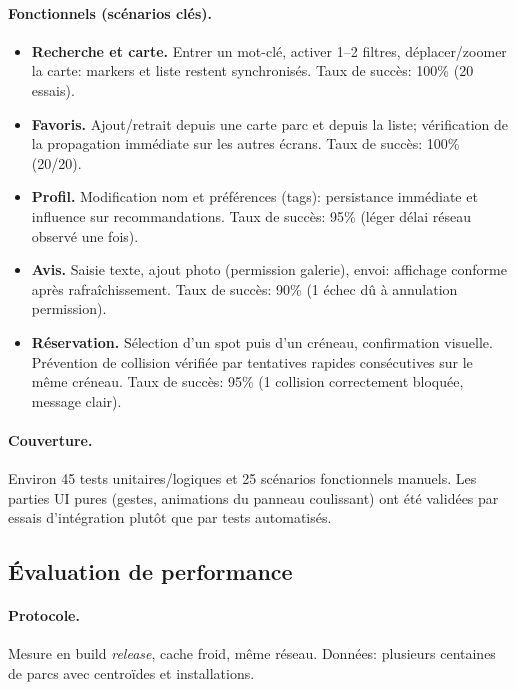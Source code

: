 \documentclass[12pt,a4paper]{article}
\begin{document}
\paragraph{Fonctionnels (scénarios clés).}
\begin{itemize}
  \item \textbf{Recherche et carte.} Entrer un mot-clé, activer 1--2 filtres, déplacer/zoomer la carte: markers et liste restent synchronisés. Taux de succès: 100\% (20 essais).
  \item \textbf{Favoris.} Ajout/retrait depuis une carte parc et depuis la liste; vérification de la propagation immédiate sur les autres écrans. Taux de succès: 100\% (20/20).
  \item \textbf{Profil.} Modification nom et préférences (tags): persistance immédiate et influence sur recommandations. Taux de succès: 95\% (léger délai réseau observé une fois).
  \item \textbf{Avis.} Saisie texte, ajout photo (permission galerie), envoi: affichage conforme après rafraîchissement. Taux de succès: 90\% (1 échec dû à annulation permission).
  \item \textbf{Réservation.} Sélection d’un spot puis d’un créneau, confirmation visuelle. Prévention de collision vérifiée par tentatives rapides consécutives sur le même créneau. Taux de succès: 95\% (1 collision correctement bloquée, message clair).
\end{itemize}

\paragraph{Couverture.}
Environ 45 tests unitaires/logiques et 25 scénarios fonctionnels manuels. Les parties UI pures (gestes, animations du panneau coulissant) ont été validées par essais d’intégration plutôt que par tests automatisés.

\subsection{Évaluation de performance}

\paragraph{Protocole.}
Mesure en build \emph{release}, cache froid, même réseau. Données: plusieurs centaines de parcs avec centroïdes et installations.
\end{document}
